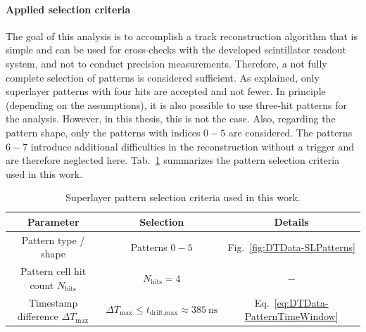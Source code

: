 \paragraph{Applied selection criteria}
The goal of this analysis is to accomplish a track reconstruction algorithm that is simple and can be used for cross-checks with the developed scintillator readout system, and not to conduct precision measurements. Therefore, a not fully complete selection of patterns is considered sufficient. As explained, only superlayer patterns with four hits are accepted and not fewer. In principle (depending on the assumptions), it is also possible to use three-hit patterns for the analysis. However, in this thesis, this is not the case. Also, regarding the pattern shape, only the patterns with indices $0-5$ are considered. The patterns $6-7$ introduce additional difficulties in the reconstruction without a trigger and are therefore neglected here. Tab.\ \ref{tab:DTData-PatternSelection} summarizes the pattern selection criteria used in this work.
\begin{table}[htb]
    \centering
    \begin{tabular}{|c|c|c|} 
        \hline
        Parameter & Selection & Details \\ \hline
        Pattern type / shape & Patterns $0-5$ & Fig.\ \ref{fig:DTData-SLPatterns} \\
        Pattern cell hit count $N_\text{hits}$ & $N_\text{hits}=4$ & $-$ \\
        Timestamp difference $\Delta T_\text{max}$ & $\Delta T_\text{max} \leq t_\text{drift,max}\approx\SI{385}{\nano\second}$ & Eq.\ \ref{eq:DTData-PatternTimeWindow} \\ \hline
    \end{tabular}
    \caption{Superlayer pattern selection criteria used in this work.}
    \label{tab:DTData-PatternSelection}
\end{table}
